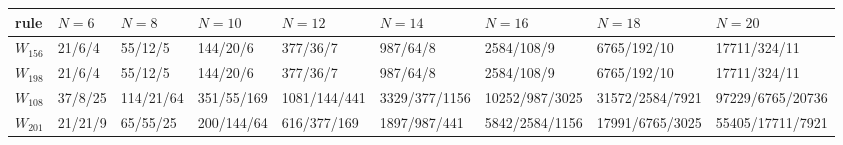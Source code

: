 \begin{tabular}{lllllllll}
\toprule
rule & $N=6$ & $N=8$ & $N=10$ & $N=12$ & $N=14$ & $N=16$ & $N=18$ & $N=20$ \\
\midrule
$W_{156}$ & 21/6/4 & 55/12/5 & 144/20/6 & 377/36/7 & 987/64/8 & 2584/108/9 & 6765/192/10 & 17711/324/11 \\
$W_{198}$ & 21/6/4 & 55/12/5 & 144/20/6 & 377/36/7 & 987/64/8 & 2584/108/9 & 6765/192/10 & 17711/324/11 \\
$W_{108}$ & 37/8/25 & 114/21/64 & 351/55/169 & 1081/144/441 & 3329/377/1156 & 10252/987/3025 & 31572/2584/7921 & 97229/6765/20736 \\
$W_{201}$ & 21/21/9 & 65/55/25 & 200/144/64 & 616/377/169 & 1897/987/441 & 5842/2584/1156 & 17991/6765/3025 & 55405/17711/7921 \\
\bottomrule
\end{tabular}
